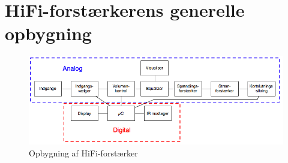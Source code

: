 \section{HiFi-forstærkerens generelle opbygning}

\begin{figure}[h]
\centering
\includegraphics[scale=.6]{indledende_analyse/generel_effektforstaerker/forstaerker_opbygning.png}
\caption{Opbygning af HiFi-forstærker}
\label{}
\end{figure}